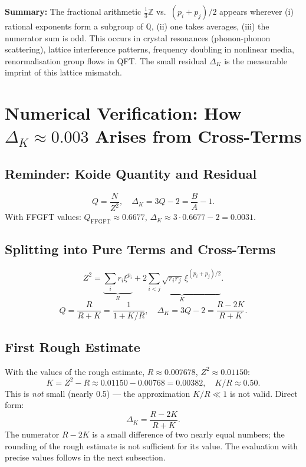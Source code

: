 \medskip\noindent
\textbf{Summary:} The fractional arithmetic $\tfrac{1}{3}\mathbb{Z}$
vs.\ $(p_i+p_j)/2$
appears wherever (i) rational exponents form a subgroup of $\mathbb{Q}$,
(ii) one takes averages, (iii) the numerator sum is odd.
This occurs in crystal resonances (phonon-phonon scattering),
lattice interference patterns, frequency doubling in nonlinear media,
renormalisation group flows in QFT.
The small residual $\Delta_K$ is the measurable imprint of this lattice mismatch.

\section{Numerical Verification: How $\Delta_K\approx0.003$ Arises from Cross-Terms}


\subsection{Reminder: Koide Quantity and Residual}

\[
  Q=\frac{N}{Z^2}, \quad \Delta_K=3Q-2=\frac{B}{A}-1.
\]
With FFGFT values: $Q_{\text{FFGFT}}\approx0.6677$,
$\Delta_K\approx3\cdot0.6677-2=0.0031$.

\subsection{Splitting into Pure Terms and Cross-Terms}

\[
  Z^2 = \underbrace{\sum_ir_i\xi^{p_i}}_{R}
      + \underbrace{2\sum_{i<j}\sqrt{r_ir_j}\,\xi^{(p_i+p_j)/2}}_{K}.
\]
\[
  Q=\frac{R}{R+K}=\frac{1}{1+K/R}, \quad
  \Delta_K=3Q-2=\frac{R-2K}{R+K}.
\]

\subsection{First Rough Estimate}

With the values of the rough estimate, $R\approx0.007678$, $Z^2\approx0.01150$:
\[
  K=Z^2-R\approx0.01150-0.00768=0.00382, \quad K/R\approx0.50.
\]
This is \emph{not} small (nearly 0.5) --- the approximation $K/R\ll1$ is not valid.
Direct form:
\[
  \Delta_K=\frac{R-2K}{R+K}.
\]
The numerator $R-2K$ is a small difference of two nearly equal numbers;
the rounding of the rough estimate is not sufficient for its value.
The evaluation with precise values follows in the next subsection.

